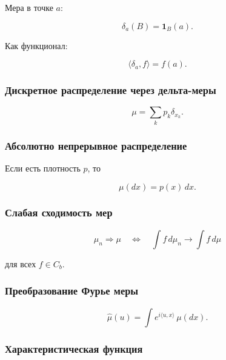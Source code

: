 \documentclass[
  11pt,
  a4paper,
]{article}
\begin{document}
Мера в точке \(a\):

\[
\delta_a(B)=\mathbf 1_B(a).
\]

Как функционал:

\[
\langle\delta_a,f\rangle=f(a).
\]

\subsubsection{Дискретное распределение через
дельта-меры}\label{ux434ux438ux441ux43aux440ux435ux442ux43dux43eux435-ux440ux430ux441ux43fux440ux435ux434ux435ux43bux435ux43dux438ux435-ux447ux435ux440ux435ux437-ux434ux435ux43bux44cux442ux430-ux43cux435ux440ux44b}

\[
\mu=\sum_k p_k\delta_{x_k}.
\]

\subsubsection{Абсолютно непрерывное
распределение}\label{ux430ux431ux441ux43eux43bux44eux442ux43dux43e-ux43dux435ux43fux440ux435ux440ux44bux432ux43dux43eux435-ux440ux430ux441ux43fux440ux435ux434ux435ux43bux435ux43dux438ux435}

Если есть плотность \(p\), то

\[
\mu(dx)=p(x)\,dx.
\]

\subsubsection{Слабая сходимость
мер}\label{ux441ux43bux430ux431ux430ux44f-ux441ux445ux43eux434ux438ux43cux43eux441ux442ux44c-ux43cux435ux440}

\[
\mu_n\Rightarrow\mu
\quad\Longleftrightarrow\quad
\int f\,d\mu_n\to\int f\,d\mu
\]

для всех \(f\in C_b\).

\subsubsection{Преобразование Фурье
меры}\label{ux43fux440ux435ux43eux431ux440ux430ux437ux43eux432ux430ux43dux438ux435-ux444ux443ux440ux44cux435-ux43cux435ux440ux44b}

\[
\widehat\mu(u)=\int e^{i\langle u,x\rangle}\,\mu(dx).
\]

\subsubsection{Характеристическая
функция}\label{ux445ux430ux440ux430ux43aux442ux435ux440ux438ux441ux442ux438ux447ux435ux441ux43aux430ux44f-ux444ux443ux43dux43aux446ux438ux44f}
\end{document}
